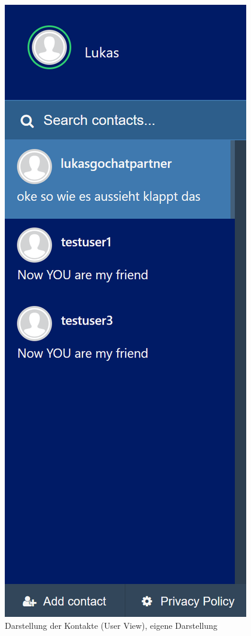 \documentclass[a4paper,titlepage,halfparskip,12pt]{scrreprt}
\begin{document}
\begin{onehalfspacing}
\begin{figure}[h]
\begin{minipage}[c]{.45\textwidth}
		\includegraphics[scale=0.35]{images/KontaktlisteUserview}
		\caption{Darstellung der Kontakte (User View), eigene Darstellung}
		\label{img:KontaktlisteUserview}
	\end{minipage}

\end{figure}
\end{onehalfspacing}
\end{document}

